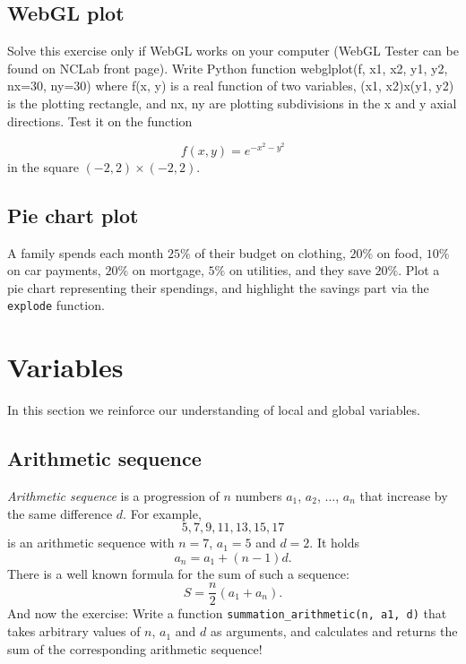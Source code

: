 
\subsection{WebGL plot}

Solve this exercise only if WebGL works on your 
computer (WebGL Tester can be found on NCLab 
front page). Write Python function webglplot(f, x1, x2, y1, y2, nx=30, ny=30) where 
f(x, y) is a real function of two variables, (x1, x2)x(y1, y2) is the plotting 
rectangle, and nx, ny are plotting subdivisions in the x and y axial directions. 
Test it on the function

$$
f(x, y) = e^{-x^2 - y^2}
$$
in the square $(-2, 2)\times (-2, 2)$.


\subsection{Pie chart plot}

A family spends each month $25 \%$ of their budget on clothing,
$20\%$ on food, $10\%$ on car payments, $20 \%$ on mortgage,
$5 \%$ on utilities, and they save $20 \%$. Plot a pie chart 
representing their spendings, and highlight the savings part via 
the {\tt explode} function.


\section{Variables}

In this section we reinforce our understanding of local and global variables.


\subsection{Arithmetic sequence}

{\em Arithmetic sequence} is a progression of $n$ numbers $a_1$, $a_2$, $\ldots$, $a_n$
that increase by the same difference $d$. For example, 
$$
5, 7, 9, 11, 13, 15, 17
$$
is an arithmetic sequence with $n = 7$, $a_1 = 5$ and $d = 2$. It holds
$$
a_n = a_1 + (n-1)d.
$$
There is a well known formula for the sum of such a sequence:
$$
S = \frac{n}{2}(a_1 + a_n).
$$
And now the exercise: Write a function {\tt summation\_arithmetic(n, a1, d)} that takes arbitrary 
values of $n$, $a_1$ and $d$ as arguments, and calculates and returns the sum
of the corresponding arithmetic sequence!

